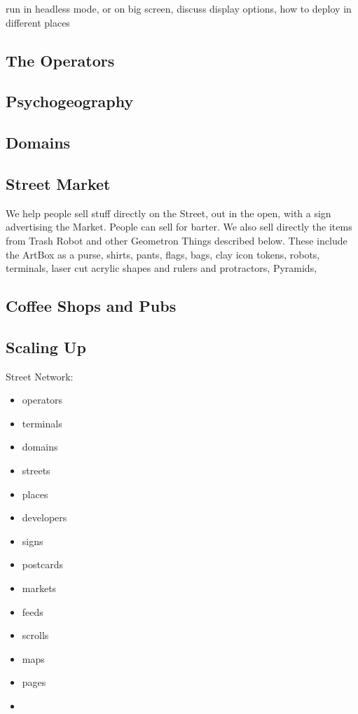 run in headless mode, or on big screen, discuss display options, how to deploy in different places

\subsection{The Operators}
\subsection{Psychogeography}
\subsection{Domains}
\subsection{Street Market}
We help people sell stuff directly on the Street, out in the open, with a sign advertising the Market.  People can sell for barter.  We also sell directly the items from Trash Robot and other Geometron Things described below.  These include the ArtBox as a purse, shirts, pants, flags, bags, clay icon tokens, robots, terminals, laser cut acrylic shapes and rulers and protractors, Pyramids,
\subsection{Coffee Shops and Pubs}
\subsection{Scaling Up}


Street Network:

\begin{itemize}
  \tightlist
  \item
  operators  
  \item
  terminals
  \item
  domains
  \item
  streets
  \item
  places
  \item
  developers
  \item
  signs
  \item 
  postcards
  \item
  markets
  \item
  feeds
  \item
  scrolls
  \item
  maps
  \item
  pages
  \item  
\end{itemize}






